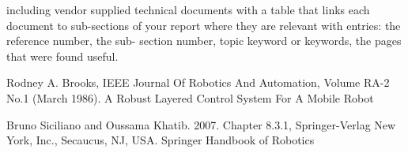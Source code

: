 \begin{thebibliography}{9}

 including vendor supplied technical documents with a table that links each document to sub-sections of your report where they are relevant with entries: the reference number, the sub- section number, topic keyword or keywords, the pages that were found useful.

Rodney A. Brooks, IEEE Journal Of Robotics And Automation, Volume RA-2 No.1 (March 1986).
\newblock A Robust Layered Control System For A Mobile Robot

Bruno Siciliano and Oussama Khatib. 2007. Chapter 8.3.1, Springer-Verlag New York, Inc., Secaucus, NJ, USA.
\newblock Springer Handbook of Robotics

\end{thebibliography}